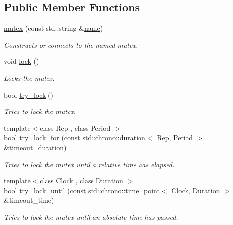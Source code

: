 \subsection*{Public Member Functions}
\begin{DoxyCompactItemize}
\item 
\hyperlink{classcpen333_1_1process_1_1posix_1_1mutex_a72ecaf79b2e4ea585b542dc0ed240614}{mutex} (const std\+::string \&\hyperlink{classcpen333_1_1process_1_1impl_1_1named__resource__base_a53986a0a1dd26a3602b842c45613b79d}{name})
\begin{DoxyCompactList}\small\item\em Constructs or connects to the named mutex. \end{DoxyCompactList}\item 
void \hyperlink{classcpen333_1_1process_1_1posix_1_1mutex_a07dccda80dc88292fa490ce47dd0faa6}{lock} ()
\begin{DoxyCompactList}\small\item\em Locks the mutex. \end{DoxyCompactList}\item 
bool \hyperlink{classcpen333_1_1process_1_1posix_1_1mutex_ae19f7c8370308f7333cee340fef91049}{try\+\_\+lock} ()
\begin{DoxyCompactList}\small\item\em Tries to lock the mutex. \end{DoxyCompactList}\item 
{\footnotesize template$<$class Rep , class Period $>$ }\\bool \hyperlink{classcpen333_1_1process_1_1posix_1_1mutex_a28ac1db650efaae2d959df0e555f3d24}{try\+\_\+lock\+\_\+for} (const std\+::chrono\+::duration$<$ Rep, Period $>$ \&timeout\+\_\+duration)
\begin{DoxyCompactList}\small\item\em Tries to lock the mutex until a relative time has elapsed. \end{DoxyCompactList}\item 
{\footnotesize template$<$class Clock , class Duration $>$ }\\bool \hyperlink{classcpen333_1_1process_1_1posix_1_1mutex_a0cfd76098d89d269ad4a89115e7673d1}{try\+\_\+lock\+\_\+until} (const std\+::chrono\+::time\+\_\+point$<$ Clock, Duration $>$ \&timeout\+\_\+time)
\begin{DoxyCompactList}\small\item\em Tries to lock the mutex until an absolute time has passed. \end{DoxyCompactList}\item 

\end{DoxyCompactItemize}
